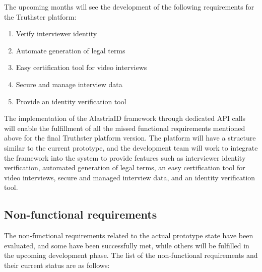 \documentclass[target=mst,aauheader=]{thud}
\begin{document}
\begin{enumerate}
    \end{enumerate}

    The upcoming months will see the development of the following requirements for the Truthster platform:

    \begin{enumerate}

        \item Verify interviewer identity
        \item Automate generation of legal terms
        \item Easy certification tool for video interviews
        \item Secure and manage interview data
        \item Provide an identity verification tool

    \end{enumerate}

The implementation of the AlastriaID framework through dedicated API calls will enable the fulfillment of all the missed functional requirements mentioned above for the final Truthster platform version. The platform will have a structure similar to the current prototype, and the development team will work to integrate the framework into the system to provide features such as interviewer identity verification, automated generation of legal terms, an easy certification tool for video interviews, secure and managed interview data, and an identity verification tool.\par

\subsection{Non-functional requirements}

The non-functional requirements related to the actual prototype state have been evaluated, and some have been successfully met, while others will be fulfilled in the upcoming development phase. The list of the non-functional requirements and their current status are as follows:
\end{document}
